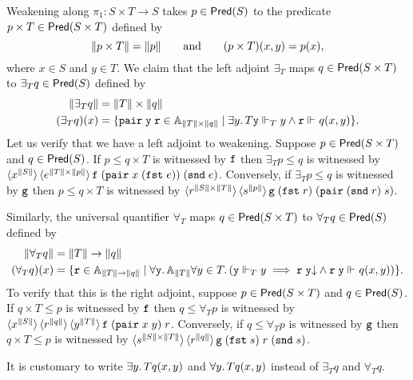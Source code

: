 Weakening along $\pi_1 : S \times T \to S$ takes $p
\in \Pred{S}$ to the predicate $p \times T \in
\Pred{S \times T}$ defined by
%
\begin{equation*}
  \T{p \times T} = \T{p}
  \qquad\text{and}\qquad
  (p \times T)(x,y) = p(x),
\end{equation*}
%
where $x \in S$ and $y \in T$. We claim that the left adjoint
$\exists_{T}$ maps $q \in \Pred{S \times T}$ to
$\exists_{T} q \in \Pred{S}$ defined by
%
\begin{align*}
  \T{\exists_{T} q} &= \T{T} \times \T{q} \\
  (\exists_{T} q)(x) &=
  \set{ \combPair\;\R{y}\;\R{r} \in \Atyp{\T{T} \times \T{q}} \such
    \some{y}{T}{\R{y} \rz[T] y \land \R{r} \rz q(x,y)}
  }.
\end{align*}
%
Let us verify that we have a left adjoint to weakening. Suppose $p \in
\Pred{S \times T}$ and $q \in \Pred{S}$. If $p \leq
q \times T$ is witnessed by $\R{f}$ then $\exists_{T} p
\leq q$ is witnessed by $\tpcalam{x}{\T{S}} \tpcalam{e}{\T{T} \times
    \T{p}}{\R{f}\; (\combPair \; x \; (\combFst\; e)) \; (\combSnd \; e)}$.
Conversely, if $\exists_{T} p \leq q$ is witnessed by $\R{g}$
then $p \leq q \times T$ is witnessed by $\tpcalam{r}{\T{S}
    \times \T{T}} \tpcalam{s}{\T{p}}{\R{g} \;
  (\combFst\;r)\; (\combPair \; (\combSnd \; r) \; s)}$.

Similarly, the universal quantifier $\forall_{T}$ maps $q \in
\Pred{S \times T}$ to $\forall_{T} q \in
\Pred{S}$ defined by
%
\begin{align*}
  \T{\forall_{T} q} &= \T{T} \to \T{q} \\
  (\forall_{T} q)(x) &=
  \set{ \R{r} \in \Atyp{\T{T} \to \T{q}} \such
    \all{\R{y}}{\Atyp{\T{T}}}{
      \all{y \in T}
        (\R{y} \rz[T] y \implies
        \defined{\R{r}\;\R{y}} \land
        \R{r}\;\R{y} \rz q(x,y))
    }
  }.
\end{align*}
%
To verify that this is the right adjoint, suppose $p \in \Pred{S
  \times T}$ and $q \in \Pred{S}$. If $q \times T
\leq p$ is witnessed by $\R{f}$ then $q \leq \forall_{T} p$ is
witnessed by $\tpcalam{x}{\T{S}} \tpcalam{r}{\T{q}}
  \tpcalam{y}{\T{T}}{\R{f} \; (\combPair \; x \; y) \; r}$. Conversely,
if $q \leq \forall_{T} p$ is witnessed by $\R{g}$ then $q \times
T \leq p$ is witnessed by $\tpcalam{s}{\T{S} \times \T{T}}
  \tpcalam{r}{\T{q}}{\R{g} \; (\combFst \; s) \; r \; (\combSnd \; s)}$.

It is customary to write $\some{y}{T}{q(x,y)}$ and
$\all{y}{T}{q(x,y)}$ instead of $\exists_{T} q$ and
$\forall_{T} q$.

